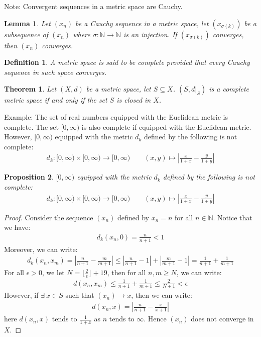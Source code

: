 \documentclass[11pt]{book}
\theoremstyle{break}
\theoremstyle{break}
\newtheorem{thm}{Theorem}[section]
\newtheorem{lem}{Lemma}[thm]
\newtheorem{prop}[lem]{Proposition}
\newtheorem{defn}{Definition}[corL]
\newcommand{\N}{\mathbb{N}}
\newcommand{\note}{\color{red}Note: \color{black}}
\newcommand{\example}{\color{green}Example: \color{black}}
\begin{document}
\note Convergent sequences in a metric space are Cauchy. \\


\begin{lem}
Let $(x_n)$ be a Cauchy sequence in a metric space, let $(x_{\sigma(k)})$ be a subsequence of $(x_n)$ where $\sigma:\N \to \N$ is an injection. If $(x_{\sigma(k)})$ converges, then $(x_n)$ converges. 
\end{lem}

\begin{defn}
A metric space is said to be complete provided that every Cauchy sequence in such space converges. 
\end{defn}

\begin{thm}
Let $(X,d)$ be a metric space, let $S \subseteq X$. $(S,d|_S)$ is a complete metric space if and only if the set $S$ is closed in $X$. 
\end{thm}

\example The set of real numbers equipped with the Euclidean metric is complete. The set $[0,\infty)$ is also complete if equipped with the Euclidean metric. However, $[0,\infty)$ equipped with the metric $d_k$ defined by the following is not complete:
\begin{align*}
d_k:[0,\infty)\times [0,\infty)\to [0,\infty) \qquad (x,y)\mapsto \left| \frac{x}{1+x}-\frac{y}{1+y}\right|
\end{align*}

\begin{prop}
$[0,\infty)$ equipped with the metric $d_k$ defined by the following is not complete:
\begin{align*}
d_k:[0,\infty)\times [0,\infty)\to [0,\infty) \qquad (x,y)\mapsto \left| \frac{x}{1+x}-\frac{y}{1+y}\right|
\end{align*}
\end{prop}
\begin{proof}
Consider the sequence $(x_n)$ defined by $x_n = n$ for all $n \in \N$. Notice that we have:
\begin{align*}
d_k(x_n,0) = \frac{n}{n+1} < 1
\end{align*}
Moreover, we can write:
\begin{align*}
d_k(x_n,x_m) = \left| \frac{n}{n+1}- \frac{m}{m+1}\right| \leq \left|\frac{n}{n+1}-1 \right| + \left| \frac{m}{m+1}-1\right| = \frac{1}{n+1}+\frac{1}{m+1}
\end{align*}
For all $\epsilon>0$, we let $N = \lfloor\frac{2}{\epsilon}\rfloor + 19$, then for all $n,m \geq N$, we can write:
\begin{align*}
d(x_n,x_m) \leq \frac{1}{n+1}+\frac{1}{m+1} \leq \frac{2}{N+1} < \epsilon
\end{align*}
However, if $\exists\ x \in S$ such that $(x_n) \to x$, then we can write:
\begin{align*}
d(x_n,x) = \left| \frac{n}{n+1}- \frac{x}{x+1}\right| 
\end{align*}
here $d(x_n,x)$ tends to $\frac{1}{1+x}$ as $n$ tends to $\infty$. Hence $(x_n)$ does not converge in $X$. 
\end{proof}
\end{document}
